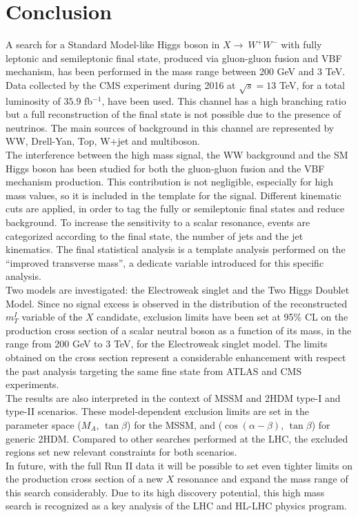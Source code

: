 \chapter*{Conclusion}
A search for a Standard Model-like Higgs boson in $X \to \ W^+W^-$ with fully leptonic and semileptonic final state, produced via gluon-gluon fusion and VBF 
mechanism, has been performed in the mass range between 200 GeV and 3 TeV.
Data collected by the CMS experiment during 2016 at $\sqrt{s}=13$ TeV, for a total luminosity of $35.9$ fb$^{-1}$, have been used.
This channel has a high branching ratio but a full reconstruction of the final state is not possible due to the presence of neutrinos. 
The main sources of background in this channel are represented by WW, Drell-Yan, Top, W+jet and multiboson.\\
The interference between the high mass signal, the WW background and the SM Higgs boson has been studied for both the gluon-gluon fusion and the VBF mechanism production.
This contribution is not negligible, especially for high mass values, so it is included in the template for the signal.
Different kinematic cuts are applied, in order to tag the fully or semileptonic final states and reduce background. 
To increase the sensitivity to a scalar resonance, events are categorized according to the final state, the number of jets 
and the jet kinematics. 
The final statistical analysis is a template analysis performed on the ``improved transverse mass'', a dedicate variable
introduced for this specific analysis.\\
Two models are investigated: the Electroweak singlet and the Two Higgs Doublet Model.
Since no signal excess is observed in the distribution of the reconstructed $m_T^I$ variable of the $X$ candidate,  
exclusion limits have been set at 95\% CL on the production cross section of a scalar neutral boson
as a function of its mass, in the range from 200 GeV to 3 TeV, for the Electroweak singlet model.
The limits obtained on the cross section represent a considerable enhancement with respect the past analysis 
targeting the same fine state from ATLAS and CMS experiments.\\
The results are also interpreted in the context of MSSM and  2HDM type-I and type-II scenarios.  
These model-dependent exclusion limits are set in the parameter space ($M_A$, $\tan \beta$) for the MSSM, and ($\cos(\alpha - \beta)$, $\tan \beta$) for generic
2HDM. Compared to other searches performed at the LHC, the excluded regions set new relevant constraints for both scenarios.\\
In future, with the full Run II data it will be possible to set even tighter limits on the
production cross section of a new $X$ resonance and expand the mass range
of this search considerably. Due to its high discovery potential, this high mass search is recognized as a key analysis of the LHC and HL-LHC physics
program.












